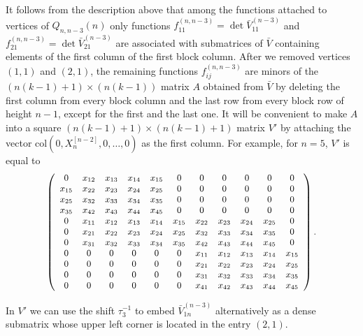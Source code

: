 \documentclass{amsart}
\theoremstyle{definition}
\theoremstyle{remark}
\numberwithin{equation}{section}
\numberwithin{theorem}{section}
\begin{document}
It follows from the description above that among the functions attached to vertices
of $Q_{n,n-3}(n)$
only functions  $f_{11}^{(n, n-3)}= \det \bar V_{11}^{(n-3)}$ and $f_{21}^{(n,
n-3)}= \det \bar V_{21}^{(n-3)}$ are associated
with submatrices of $\bar V$ containing elements of the first column of the
first block column. After we removed
vertices $(1,1)$ and $(2,1)$, the remaining functions $f_{ij}^{(n, n-3)}$ are minors of the $(n
(k-1)+1)\times (n (k-1))$ matrix $A$ obtained from $\bar V$ by deleting
 the first column from  every block column and the last row from every block row of height $n-1$, 
 except for the first and the last one.   It will be convenient to make $A$ into a square 
  $(n(k-1)+1)\times (n (k-1)+1)$ matrix $V'$ by attaching the 
  vector $\mbox{col} (0, X_n^{[n-2]}, 0, \ldots, 0)$ as the first column.
For example, for  $n=5$,
 $V'$ is equal to
 $${\small
\left (
 \begin{array}{ccccccccccc}
 0  & x_{12} & x_{13} &  x_{14} & x_{15}& 0 & 0 & 0 & 0 & 0 & 0  \\
 x_{15} &  x_{22} & x_{23} & x_{24} & x_{25}& 0 & 0 & 0 & 0 & 0 & 0 \\
  x_{25} & x_{32} & x_{33} &x_{34} & x_{35}& 0 & 0 & 0 & 0 & 0 & 0 \\
x_{35} &  x_{42} & x_{43} &x_{44} & x_{45}& 0 & 0 & 0 & 0 & 0 & 0 \\
  0 &  x_{11} & x_{12} & x_{13} & x_{14} & x_{15} & x_{22} & x_{23} & x_{24} &
x_{25}& 0  \\
 0 &  x_{21} & x_{22} & x_{23} & x_{24} & x_{25} & x_{32} & x_{33} & x_{34} &
x_{35}& 0  \\
 0 &  x_{31} & x_{32} & x_{33} & x_{34} & x_{35} & x_{42} & x_{43} & x_{44} &
x_{45}& 0  \\
 0 & 0 & 0 & 0 & 0 & 0 &    x_{11} & x_{12} & x_{13} & x_{14} & x_{15}  \\
 0 & 0 & 0 & 0 & 0 & 0 &   x_{21} & x_{22} & x_{23} & x_{24} & x_{25}  \\
 0 & 0 & 0 & 0 & 0 & 0 &   x_{31} & x_{32} & x_{33} & x_{34} & x_{35}   \\
 0 & 0 & 0 & 0 & 0 & 0 &   x_{41} & x_{42} & x_{43} & x_{44} & x_{45}
 \end{array}
 \right ).
}
 $$
 
 In $V'$ we can use the shift
 $\tau_3^{-1}$ to embed $\bar V_{1n}^{(n-3)}$ alternatively as a dense submatrix whose upper left corner is located in the entry $(2,1)$.
 
\end{document}
